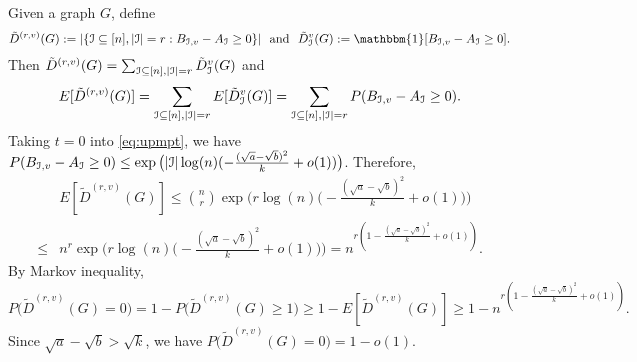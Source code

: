 \documentclass{article}
\begin{document}
Given a graph $G$, define 
$$
\tilde{D}^{(r,v)}(G):=|\{\cI\subseteq[n],|\cI|=r:B_{\cI,v}- A_{\cI}\ge 0\}|
\text{~~and~~}
\tilde{D}^v_{\cI}(G):=\mathbbm{1}[B_{\cI,v}-A_{\cI}\ge 0] .
$$
 Then
$\tilde{D}^{(r,v)}(G)=\sum_{\mathcal{I}\subseteq[n],|\mathcal{I}|=r} \tilde{D}^v_{\mathcal{I}}(G)$ and
$$
E[\tilde{D}^{(r, v)}(G)]=\sum_{\mathcal{I}\subseteq[n],|\mathcal{I}|=r} E[\tilde{D}^v_{\mathcal{I}}(G)]
=\sum_{\mathcal{I}\subseteq[n],|\mathcal{I}|=r} P(B_{\mathcal{I},v}- A_{\mathcal{I}}\ge 0).
$$
Taking $t=0$ into \eqref{eq:upmpt}, we have
$P(B_{\mathcal{I},v}- A_{\mathcal{I}}\ge 0)\le \exp\big(|\mathcal{I}|\log(n)(-\frac{(\sqrt{a}-\sqrt{b})^2}{k} + o(1) ) \big)$. Therefore,
\begin{align*}
& E[\tilde{D}^{(r,v)}(G)]\le \binom{n}{r} \exp\Big(r \log(n)\big(-\frac{(\sqrt{a}-\sqrt{b})^2}{k} + o(1) \big) \Big) \\
\le & n^r \exp\Big(r \log(n)\big(-\frac{(\sqrt{a}-\sqrt{b})^2}{k} + o(1) \big) \Big)
= n^{r( 1-\frac{(\sqrt{a}-\sqrt{b})^2}{k} + o(1) )}.
\end{align*}
By Markov inequality,
\begin{equation} \label{eq:Dk}
P\big(\tilde{D}^{(r,v)}(G)=0 \big) = 1-
P\big(\tilde{D}^{(r,v)}(G)\ge 1\big) \ge 1- E[\tilde{D}^{(r,v)}(G)]
\ge 1-  n^{r (1-\frac{(\sqrt{a}-\sqrt{b})^2}{k} + o(1) )} .
\end{equation}
Since $\sqrt{a}-\sqrt{b} > \sqrt{k}$, we have
$P\big(\tilde{D}^{(r,v)}(G)=0 \big)= 1-o(1)$.
\end{document}
